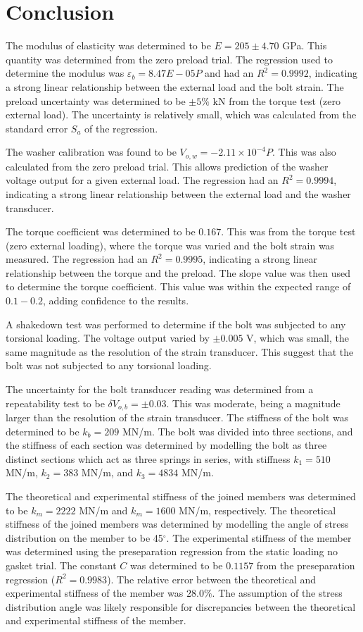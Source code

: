 \section{Conclusion}
The modulus of elasticity was determined to be $E = 205 \pm 4.70$ GPa. This quantity was determined from the zero preload trial. The regression used to determine the modulus was $\varepsilon_{b} = 8.47E-05 P$ and had an $R^2 = 0.9992$, indicating a strong linear relationship between the external load and the bolt strain. The preload uncertainty was determined to be $\pm 5\%$ kN from the torque test (zero external load). The uncertainty is relatively small, which was calculated from the standard error $S_{a}$ of the regression.

The washer calibration was found to be $V_{o, w} = -2.11 \times 10^{-4}P$. This was also calculated from the zero preload trial. This allows prediction of the washer voltage output for a given external load. The regression had an $R^2 = 0.9994$, indicating a strong linear relationship between the external load and the washer transducer.

The torque coefficient was determined to be $0.167$. This was from the torque test (zero external loading), where the torque was varied and the bolt strain was measured. The regression had an $R^2 = 0.9995$, indicating a strong linear relationship between the torque and the preload. The slope value was then used to determine the torque coefficient. This value was within the expected range of $0.1 - 0.2$, adding confidence to the results.

A shakedown test was performed to determine if the bolt was subjected to any torsional loading. The voltage output varied by $\pm 0.005$ V, which was small, the same magnitude as the resolution of the strain transducer. This suggest that the bolt was not subjected to any torsional loading. 

The uncertainty for the bolt transducer reading was determined from a repeatability test to be $\delta V_{o, b} =\pm 0.03$. This was moderate, being a magnitude larger than the resolution of the strain transducer. 
The stiffness of the bolt was determined to be $k_b = 209$ MN/m. The bolt was divided into three sections, and the stiffness of each section was determined by modelling the bolt as three distinct sections which act as three springs in series, with stiffness $k_1 = 510$ MN/m, $k_2 = 383$ MN/m, and $k_3 = 4834$ MN/m. 

The theoretical and experimental stiffness of the joined members was determined to be $k_m = 2222$ MN/m and $k_m = 1600$ MN/m, respectively. The theoretical stiffness of the joined members was determined by modelling the angle of stress distribution on the member to be 45$^\circ$. The experimental stiffness of the member was determined using the preseparation regression from the static loading no gasket trial. The constant $C$ was determined to be $0.1157$ from the preseparation regression ($R^2 = 0.9983$). The relative error between the theoretical and experimental stiffness of the member was $28.0\%$. The assumption of the stress distribution angle was likely responsible for discrepancies between the theoretical and experimental stiffness of the member. 

